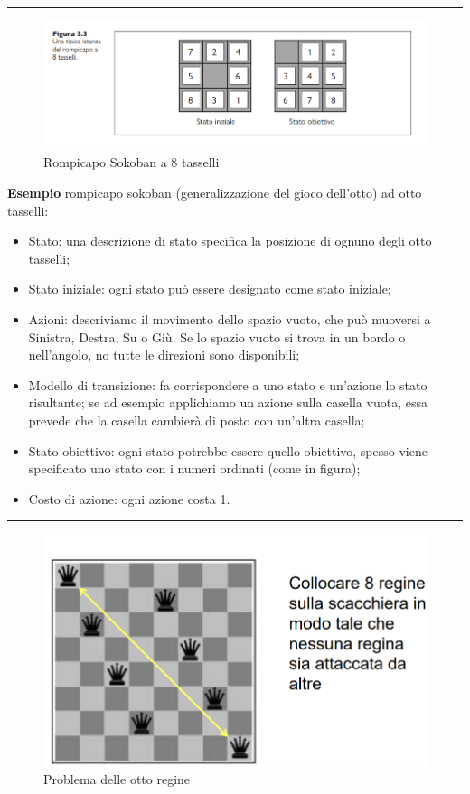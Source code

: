 \documentclass{article}
\begin{document}
\par\noindent\rule{\textwidth}{0.4pt}
\begin{figure}[H]
    \centering
    \includegraphics[width=0.5\linewidth]{Images/rompicapoSokoban8Tasselli.png}
    \caption{Rompicapo Sokoban a 8 tasselli}
    \label{fig:enter-label}
\end{figure}
\textbf{Esempio} rompicapo sokoban (generalizzazione del gioco dell'otto) ad otto tasselli:
\begin{itemize}
    \item Stato: una descrizione di stato specifica la posizione di ognuno degli otto tasselli;
    \item Stato iniziale: ogni stato può essere designato come stato iniziale;
    \item Azioni: descriviamo il movimento dello spazio vuoto, che può muoversi a Sinistra, Destra, Su o Giù. Se lo spazio vuoto si trova in un bordo o nell'angolo, no tutte le direzioni sono disponibili;
    \item Modello di transizione: fa corrispondere a uno stato e un'azione lo stato risultante; se ad esempio applichiamo un azione sulla casella vuota, essa prevede che la casella cambierà di posto con un'altra casella;
    \item Stato obiettivo: ogni stato potrebbe essere quello obiettivo, spesso viene specificato uno stato con i numeri ordinati (come in figura);
    \item Costo di azione: ogni azione costa 1.
\end{itemize}
\par\noindent\rule{\textwidth}{0.4pt}
\begin{figure}[H]
    \centering
    \includegraphics[width=0.5\linewidth]{Images/problema8Regine.png}
    \caption{Problema delle otto regine}
    \label{fig:enter-label}
\end{figure}
\end{document}
